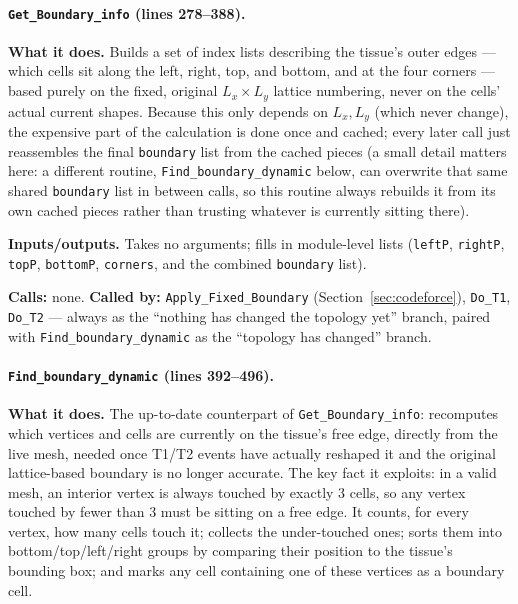 \documentclass[11pt]{article}
\begin{document}
\paragraph{\texttt{Get\_Boundary\_info} (lines 278--388).}
\textbf{What it does.} Builds a set of index lists describing the tissue's outer edges
--- which cells sit along the left, right, top, and bottom, and at the four corners ---
based purely on the fixed, original $L_x \times L_y$ lattice numbering, never on the
cells' actual current shapes. Because this only depends on $L_x,L_y$ (which never
change), the expensive part of the calculation is done once and cached; every later
call just reassembles the final \texttt{boundary} list from the cached pieces (a small
detail matters here: a different routine, \texttt{Find\_boundary\_dynamic} below, can
overwrite that same shared \texttt{boundary} list in between calls, so this routine
always rebuilds it from its own cached pieces rather than trusting whatever is
currently sitting there).

\textbf{Inputs/outputs.} Takes no arguments; fills in module-level lists
(\texttt{leftP}, \texttt{rightP}, \texttt{topP}, \texttt{bottomP}, \texttt{corners},
and the combined \texttt{boundary} list).

\textbf{Calls:} none. \textbf{Called by:} \texttt{Apply\_Fixed\_Boundary}
(Section~\ref{sec:codeforce}), \texttt{Do\_T1}, \texttt{Do\_T2} --- always as the
``nothing has changed the topology yet'' branch, paired with
\texttt{Find\_boundary\_dynamic} as the ``topology has changed'' branch.

\paragraph{\texttt{Find\_boundary\_dynamic} (lines 392--496).}
\textbf{What it does.} The up-to-date counterpart of \texttt{Get\_Boundary\_info}:
recomputes which vertices and cells are currently on the tissue's free edge, directly
from the live mesh, needed once T1/T2 events have actually reshaped it and the original
lattice-based boundary is no longer accurate. The key fact it exploits: in a valid mesh,
an interior vertex is always touched by exactly 3 cells, so any vertex touched by fewer
than 3 must be sitting on a free edge. It counts, for every vertex, how many cells touch
it; collects the under-touched ones; sorts them into bottom/top/left/right groups by
comparing their position to the tissue's bounding box; and marks any cell containing one
of these vertices as a boundary cell.
\end{document}
